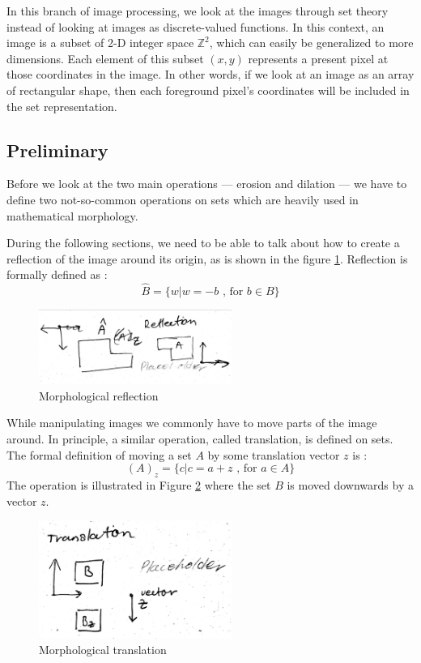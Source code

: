 \documentclass[
  digital,     %
  oneside,     %
  nosansbold,  %
  nocolorbold, %
  lof,         %
  lot,         %
]{fithesis4}
\newcommand*{\Z}{\ensuremath{\mathbb{Z}}}
\begin{document}
In this branch of image processing, we look at the images through set theory
instead of looking at images as discrete-valued functions. In this context, an
image is a subset of 2-D integer space $\Z^2$, which can easily be generalized
to more dimensions. Each element of this subset $(x, y)$ represents a present
pixel at those coordinates in the image. In other words, if we look at an image
as an array of rectangular shape, then each foreground pixel's coordinates will
be included in the set representation.

\subsection{Preliminary}
Before we look at the two main operations --- erosion and dilation --- we have to
define two not-so-common operations on sets which are heavily used in
mathematical morphology.

During the following sections, we need to be able to talk about how to create a
reflection of the image around its origin, as is shown in the figure
\ref{fig:morp_refl}. Reflection is formally defined as \parencite{gonzalez2002}:
$$\hat{B} = \{w | w=-b \text{ , for } b \in B\}$$
\begin{figure}
    \begin{center}
        \includegraphics[width=6.3cm]{resources/morph_reflection.jpg}
    \end{center}
    \caption{Morphological reflection} %
    \label{fig:morp_refl}
\end{figure}

While manipulating images we commonly have to move parts of the image around.
In principle, a similar operation, called translation, is defined on sets. The
formal definition of moving a set $A$ by some translation vector $z$ is
\parencite{gonzalez2002}:
$$(A)_z = \{c | c = a + z\text{ , for } a \in A\}$$
The operation is illustrated in Figure \ref{fig:morph_translation} where the set
$B$ is moved downwards by a vector $z$.
\begin{figure}
    \begin{center}
        \includegraphics[width=6.3cm]{resources/morph_translation.jpg}
    \end{center}
    \caption{Morphological translation} %
    \label{fig:morph_translation}
\end{figure}
\end{document}
